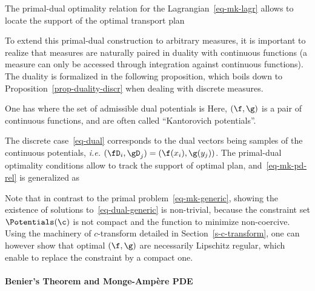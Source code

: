 The primal-dual optimality relation for the Lagrangian~\eqref{eq-mk-lagr} allows to locate the support of the optimal transport plan

To extend this primal-dual construction to arbitrary measures, it is important to realize that measures are naturally paired in duality with continuous functions (a measure can only be accessed through integration against continuous functions). The duality is formalized in the following proposition, which boils down to Proposition~\ref{prop-duality-discr} when dealing with discrete measures.
	
\begin{prop}
	One has
	where the set of admissible dual potentials is
	Here, $(\f,\g)$ is a pair of continuous functions, and are often called ``Kantorovich potentials''.
\end{prop}

The discrete case~\eqref{eq-dual} corresponds to the dual vectors being samples of the continuous potentials, \emph{i.e.} $(\fD_i,\gD_j)=(\f(x_i),\g(y_j))$. 
	The primal-dual optimality conditions allow to track the support of optimal plan, and~\eqref{eq-mk-pd-rel} is generalized as 
	
	Note that in contrast to the primal problem~\eqref{eq-mk-generic}, showing the existence of solutions to~\eqref{eq-dual-generic} is non-trivial, because the constraint set $\Potentials(\c)$ is not compact and the function to minimize non-coercive.
	Using the machinery of $c$-transform detailed in Section~\ref{s-c-transform}, one can however show that optimal $(\f,\g)$ are necessarily Lipschitz regular, which enable to replace the constraint by a compact one. 


\paragraph{Benier's Theorem and Monge-Amp\`ere PDE}

